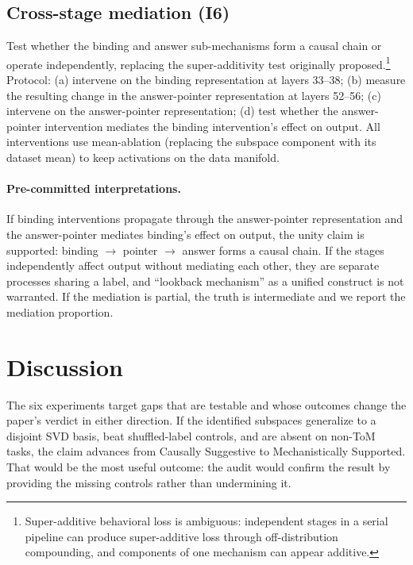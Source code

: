 \documentclass[11pt]{article}
\begin{document}
\subsection{Cross-stage mediation (I6)}
\label{sec:mediation}

Test whether the binding and answer sub-mechanisms form a causal chain or operate independently, replacing the super-additivity test originally proposed.\footnote{Super-additive behavioral loss is ambiguous: independent stages in a serial pipeline can produce super-additive loss through off-distribution compounding, and components of one mechanism can appear additive.} Protocol: (a) intervene on the binding representation at layers 33--38; (b) measure the resulting change in the answer-pointer representation at layers 52--56; (c) intervene on the answer-pointer representation; (d) test whether the answer-pointer intervention mediates the binding intervention's effect on output. All interventions use mean-ablation (replacing the subspace component with its dataset mean) to keep activations on the data manifold.

\paragraph{Pre-committed interpretations.} If binding interventions propagate through the answer-pointer representation and the answer-pointer mediates binding's effect on output, the unity claim is supported: binding $\to$ pointer $\to$ answer forms a causal chain. If the stages independently affect output without mediating each other, they are separate processes sharing a label, and ``lookback mechanism'' as a unified construct is not warranted. If the mediation is partial, the truth is intermediate and we report the mediation proportion.


\section{Discussion}
\label{sec:discussion}

The six experiments target gaps that are testable and whose outcomes change the paper's verdict in either direction. If the identified subspaces generalize to a disjoint SVD basis, beat shuffled-label controls, and are absent on non-ToM tasks, the claim advances from Causally Suggestive to Mechanistically Supported. That would be the most useful outcome: the audit would confirm the result by providing the missing controls rather than undermining it.
\end{document}
